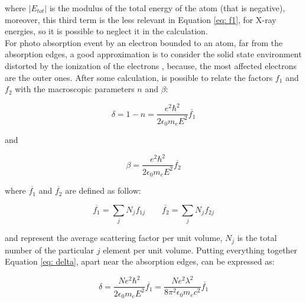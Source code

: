 \begin{flushleft}
where $|E_{tot} |$ is the modulus of the total energy of the atom (that is negative), moreover, this third term is the less relevant in Equation \ref{eq: f1}, for X-ray energies, so it is possible to neglect it in the calculation.
\\
For photo absorption event by an electron bounded to an atom, far from the absorption edges, a good approximation is to consider the solid state environment distorted by the ionization of the electrons , because, the most affected electrons are the outer ones. After some calculation, is possible to relate the factors $f_1 $ and $f_2 $ with the macroscopic parameters $n $ and $\beta $:
\end{flushleft}

\begin{equation}
\delta = 1 - n = \frac{e^2 \hbar^2}{2 \epsilon_0 m_e E^2} \overline{f_1}
\label{eq: delta}
\end{equation}

\begin{flushleft}
and
\end{flushleft}

\begin{equation}
\beta = \frac{e^2 \hbar^2}{2 \epsilon_0 m_e E^2} \overline{f_2}
\label{eq: beta}
\end{equation}

\begin{flushleft}
where $\overline{f_1} $ and $\overline{f_2} $ are defined as follow:
\end{flushleft}

\begin{equation}
\overline{f_1} = \sum_j N_j f_{1j} \qquad \overline{f_2} = \sum_j N_j f_{2j}
\label{f1, f2, mean}
\end{equation}

\begin{flushleft}
and represent the average scattering factor per unit volume, $N_j $ is the total number of the particular $j $ element per unit volume. Putting everything together Equation \ref{eq: delta}, apart near the absorption edges, can be expressed as:
\end{flushleft}

\begin{equation}
\delta = \frac{N e^2 \hbar^2}{2 \epsilon_0 m_e  E^2} \overline{f_1}  = \frac{N e^2 \lambda^2}{8 \pi^2 \epsilon_0 m_e c^2} \overline{f_1}
\label{eq: delta new}
\end{equation}

